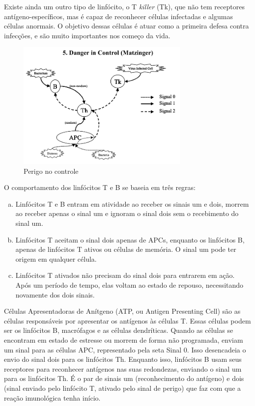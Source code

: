 Existe ainda um outro tipo de linfócito, o T \emph{killer} (Tk), que não tem receptores antígeno-específicos, mas é capaz de reconhecer células infectadas e algumas células anormais. O objetivo dessas células é atuar como a primeira defesa contra infecções, e são muito importantes nos começo da vida.

\begin{figure}[h!]
\centering
\includegraphics[width=0.75\textwidth]{img/signals5-danger.png}
\caption{Perigo no controle}
\label{img:signals-last}
\end{figure}

O comportamento dos linfócitos T e B se baseia em três regras:

\begin{enumerate}[a)]
\item Linfócitos T e B entram em atividade ao receber os sinais um e dois, morrem ao receber apenas o sinal um e ignoram o sinal dois sem o recebimento do sinal um.
\item Linfócitos T aceitam o sinal dois apenas de APCs, enquanto os linfócitos B, apenas de linfócitos T ativos ou células de memória. O sinal um pode ter origem em qualquer célula.
\item Linfócitos T ativados não precisam do sinal dois para entrarem em ação. Após um período de tempo, elas voltam ao estado de repouso, necessitando novamente dos dois sinais.
\end{enumerate}

Células Apresentadoras de Anítgeno (ATP, ou Antigen Presenting Cell) são as células responsáveis por apresentar os antígenos às células T. Essas células podem ser os linfócitos B, macrófagos e as células dendríticas. Quando as células se encontram em estado de estresse ou morrem de forma não programada, enviam um sinal para as células APC, representado pela seta Sinal 0. Isso desencadeia o envio do sinal dois para os linfócitos Th. Enquanto isso, linfócitos B usam seus receptores para reconhecer antígenos nas suas redondezas, enviando o sinal um para os linfócitos Th. É o par de sinais um (reconhecimento do antígeno) e dois (sinal enviado pelo linfócito T, ativado pelo sinal de perigo) que faz com que a reação imunológica tenha início.

